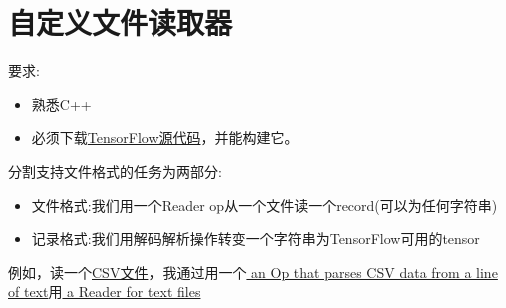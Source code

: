 \section{自定义文件读取器}
要求:
\begin{itemize}
	\item 熟悉C++
	\item 必须下载\href{https://www.tensorflow.org/install/install_sources}{TensorFlow源代码}，并能构建它。
\end{itemize}
分割支持文件格式的任务为两部分:
\begin{itemize}
	\item 文件格式:我们用一个Reader op从一个文件读一个record(可以为任何字符串)
	\item 记录格式:我们用解码解析操作转变一个字符串为TensorFlow可用的tensor
\end{itemize}
例如，读一个\href{https://en.wikipedia.org/wiki/Comma-separated_values}{CSV文件}，我通过用一个\href{https://www.tensorflow.org/api_docs/python/tf/decode_csv}{ an Op that parses CSV data from a line of text}用\href{https://www.tensorflow.org/api_docs/python/tf/TextLineReader}{ a Reader for text files}

